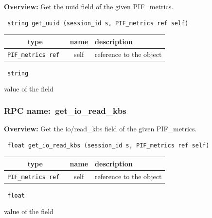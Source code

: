 {\bf Overview:} 
Get the uuid field of the given PIF\_metrics.

\begin{verbatim} string get_uuid (session_id s, PIF_metrics ref self)\end{verbatim}



 
\vspace{0.3cm}
\begin{tabular}{|c|c|p{7cm}|}
 \hline
{\bf type} & {\bf name} & {\bf description} \\ \hline
{\tt PIF\_metrics ref } & self & reference to the object \\ \hline 

\end{tabular}

\vspace{0.3cm}

{\tt 
string
}


value of the field
\vspace{0.3cm}
\vspace{0.3cm}
\vspace{0.3cm}
\subsubsection{RPC name:~get\_io\_read\_kbs}

{\bf Overview:} 
Get the io/read\_kbs field of the given PIF\_metrics.

\begin{verbatim} float get_io_read_kbs (session_id s, PIF_metrics ref self)\end{verbatim}



 
\vspace{0.3cm}
\begin{tabular}{|c|c|p{7cm}|}
 \hline
{\bf type} & {\bf name} & {\bf description} \\ \hline
{\tt PIF\_metrics ref } & self & reference to the object \\ \hline 

\end{tabular}

\vspace{0.3cm}

{\tt 
float
}


value of the field
\vspace{0.3cm}
\vspace{0.3cm}
\vspace{0.3cm}
